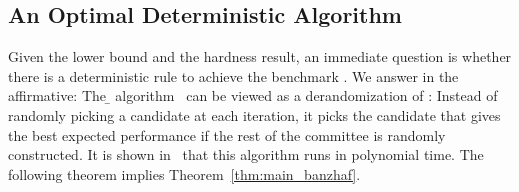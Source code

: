 
\subsection{An Optimal Deterministic Algorithm}
Given the lower bound and the hardness result, an immediate question is whether there is a deterministic rule to achieve the benchmark \rand{}. We answer in the affirmative: The \b{} algorithm~\cite{Banzhaf,dubeyS,Heuristics} can be viewed as a derandomization of \rand{}: Instead of randomly picking a candidate at each iteration, it picks the candidate that gives the best expected performance if the rest of the committee is randomly constructed. It is shown in~\cite{Heuristics} that this algorithm runs in polynomial time. The following theorem implies Theorem~\ref{thm:main_banzhaf}.

